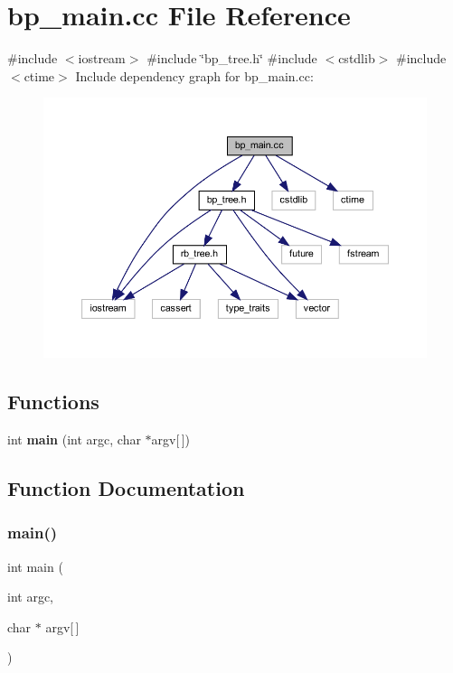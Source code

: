 \section{bp\+\_\+main.\+cc File Reference}
\label{bp__main_8cc}
{\ttfamily \#include $<$iostream$>$}\newline
{\ttfamily \#include \char`\"{}bp\+\_\+tree.\+h\char`\"{}}\newline
{\ttfamily \#include $<$cstdlib$>$}\newline
{\ttfamily \#include $<$ctime$>$}\newline
Include dependency graph for bp\+\_\+main.\+cc\+:
\nopagebreak
\begin{figure}[H]
\begin{center}
\leavevmode
\includegraphics[width=350pt]{bp__main_8cc__incl}
\end{center}
\end{figure}
\subsection*{Functions}
\begin{DoxyCompactItemize}
\item 
int \textbf{ main} (int argc, char $\ast$argv[$\,$])
\end{DoxyCompactItemize}


\subsection{Function Documentation}
\mbox{\label{bp__main_8cc_a0ddf1224851353fc92bfbff6f499fa97}} 
\subsubsection{main()}
{\footnotesize\ttfamily int main (\begin{DoxyParamCaption}\item[{int}]{argc,  }\item[{char $\ast$}]{argv[$\,$] }\end{DoxyParamCaption})}

